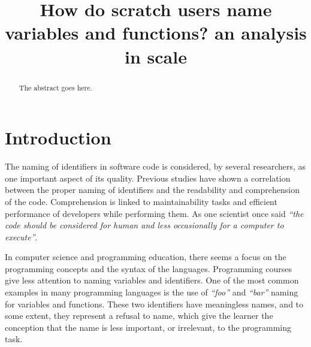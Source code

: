 \documentclass[conference]{IEEEtran}
\newcommand{\quotes}[1]{\textit{``#1''}}
\begin{document}
\title{How do scratch users name variables and functions? an analysis in scale}


\author{
\and
{}
}
\maketitle

\begin{abstract}
The abstract goes here.
\end{abstract}

\IEEEpeerreviewmaketitle



\section{Introduction}
The naming of identifiers in software code is considered, by several researchers, as one important aspect of its quality. Previous studies have shown a correlation between the proper naming of identifiers and the readability and comprehension of the code. Comprehension is linked to maintainability tasks and efficient performance of developers while performing them. As one scientist once said \quotes{the code should be considered for human and less occasionally for a computer to execute}.

In computer science and programming education, there seems a focus on the programming concepts and the syntax of the languages. Programming courses give less attention to naming variables and identifiers. One of the most common examples in many programming languages is the use of \quotes{foo} and \quotes{bar} naming for variables and functions. These two identifiers have meaningless names, and to some extent, they represent a refusal to name, which give the learner the conception that the name is less important, or irrelevant, to the programming task. 
\end{document}

